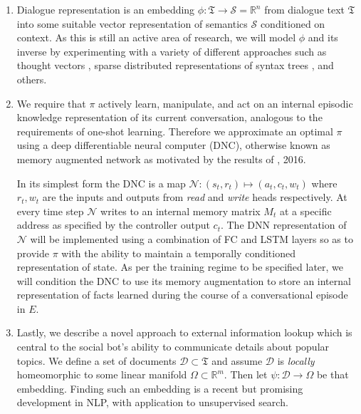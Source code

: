 \documentclass{article} %
\theoremstyle{named}
\def\scriptd{{\mathcal D}}
\def\scriptn{{\mathcal N}}
\def\scripts{{\mathcal S}}
\begin{document}
\begin{enumerate}
\item Dialogue representation is an embedding $ \phi: \mathfrak{T} \to \scripts = \mathbb{R}^n $ from dialogue text $\mathfrak{T}$ into some suitable vector representation of semantics $\scripts$ conditioned on context. As this is still an active area of research, we will model $ \phi $ and its inverse by experimenting with a variety of different approaches such as thought vectors \cite{NIPS2015_5950}, sparse distributed representations of syntax trees \cite{DBLP:journals/corr/YogatamaFDS14}, and others.

\item We require that $ \pi $ actively learn, manipulate, and act on an internal episodic knowledge representation of its current conversation, analogous to the requirements of one-shot learning. Therefore we approximate an optimal $ \pi $ using a deep differentiable neural computer (DNC)\cite{DBLP:journals/corr/GravesWD14}\cite{graves2016hybrid}, otherwise known as memory augmented network as motivated by the results of \citeauthor{DBLP:journals/corr/SantoroBBWL16}, 2016.

In its simplest form the DNC is a map $ \scriptn: (s_t, r_t) \mapsto (a_t, c_t, w_t) $ where  $ r_t, w_t $ are the inputs and outputs from \emph{read} and \emph{write} heads respectively. At every time step $\scriptn$ writes to an internal memory matrix $M_t$ at a specific address as specified by the controller output $c_t$. The DNN representation of $\scriptn$ will be implemented using a combination of FC and LSTM layers so as to provide $\pi$ with the ability to maintain a temporally conditioned representation of state. As per the training regime to be specified later, we will condition the DNC to use its memory augmentation to store an internal representation of facts learned during the course of a conversational episode in $E$.

\item Lastly, we describe a novel approach to external information lookup which is central to the social bot's ability to communicate details about popular topics. We define a set of documents $ \scriptd \subset \mathfrak{T} $ and assume $ \scriptd $ is \emph{locally} homeomorphic to some linear manifold $\Omega \subset \mathbb{R}^m$. Then let $\psi: \scriptd \to \Omega$ be that embedding. Finding such an embedding is a recent but promising development in NLP, with application to unsupervised search\cite{DBLP:journals/corr/DaiOL15}.


\end{enumerate}
\end{document}
